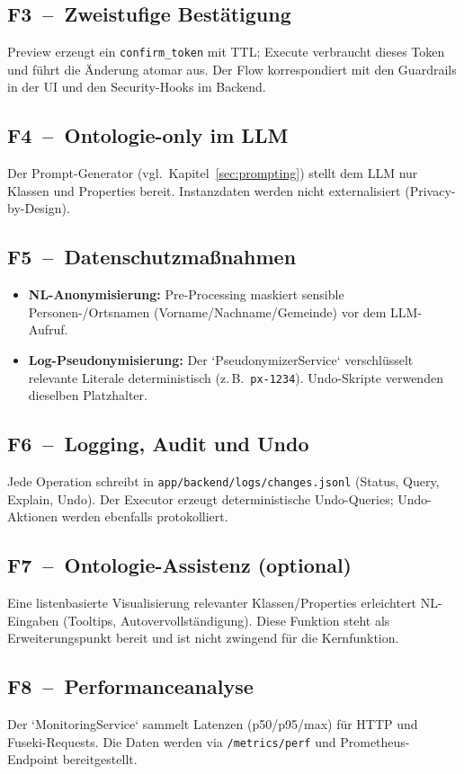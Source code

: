 \subsection*{F3~–~Zweistufige Bestätigung}
Preview erzeugt ein \texttt{confirm\_token} mit TTL; Execute verbraucht dieses Token und führt die Änderung atomar aus. Der Flow korrespondiert mit den Guardrails in der UI und den Security-Hooks im Backend.

\subsection*{F4~–~Ontologie-only im LLM}
Der Prompt-Generator (vgl.\ Kapitel~\ref{sec:prompting}) stellt dem LLM nur Klassen und Properties bereit. Instanzdaten werden nicht externalisiert (Privacy-by-Design).

\subsection*{F5~–~Datenschutzmaßnahmen}
\begin{itemize}
  \item \textbf{NL-Anonymisierung:} Pre-Processing maskiert sensible Personen-/Ortsnamen (Vorname/Nachname/Gemeinde) vor dem LLM-Aufruf.
  \item \textbf{Log-Pseudonymisierung:} Der `PseudonymizerService` verschlüsselt relevante Literale deterministisch (z.\,B.\ \texttt{px-1234}). Undo-Skripte verwenden dieselben Platzhalter.
\end{itemize}

\subsection*{F6~–~Logging, Audit und Undo}
Jede Operation schreibt in \texttt{app/backend/logs/changes.jsonl} (Status, Query, Explain, Undo). Der Executor erzeugt deterministische Undo-Queries; Undo-Aktionen werden ebenfalls protokolliert.

\subsection*{F7~–~Ontologie-Assistenz (optional)}
Eine listenbasierte Visualisierung relevanter Klassen/Properties erleichtert NL-Eingaben (Tooltips, Autovervollständigung). Diese Funktion steht als Erweiterungspunkt bereit und ist nicht zwingend für die Kernfunktion.

\subsection*{F8~–~Performanceanalyse}
Der `MonitoringService` sammelt Latenzen (p50/p95/max) für HTTP und Fuseki-Requests. Die Daten werden via \texttt{/metrics/perf} und Prometheus-Endpoint bereitgestellt.

